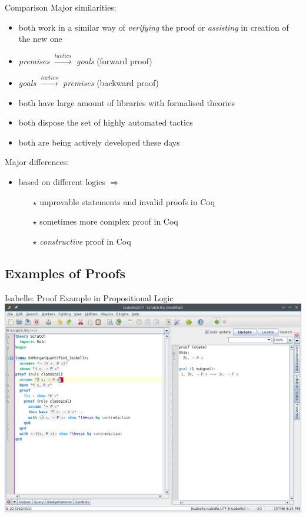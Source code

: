 \documentclass[aspectratio=169, fleqn]{beamer}
\begin{document}
\begin{frame}{Comparison}
\textcolor{dkblue}{Major similarities:}
\begin{itemize}
  \item both work in a similar way of \textit{verifying} the proof or \textit{assisting} in creation of the new one
  \item \textit{premises} $\xrightarrow{tactics}$ \textit{goals} (forward proof)
  \item \textit{goals} $\xrightarrow{tactics}$ \textit{premises} (backward proof)
  \item both have large amount of libraries with formalised theories
  \item both dispose the set of highly automated tactics
  \item both are being actively developed these days
\end{itemize}

\vspace{10pt}
\textcolor{dkblue}{Major differences:}
\begin{itemize}
  \item based on different logics $\Rightarrow$
  \begin{itemize}
    \item[$\star$] unprovable statements and invalid proofs in Coq
    \item[$\star$] sometimes more complex proof in Coq
    \item[$\star$] \textit{constructive} proof in Coq
    
  \end{itemize}
\end{itemize}

\end{frame}


\subsection{Examples of Proofs}

\begin{frame}
{Isabelle: Proof Example in Propositional Logic}
\includegraphics[scale=0.38]{img/isabelle_morgan.png}
\end{frame}
\end{document}
